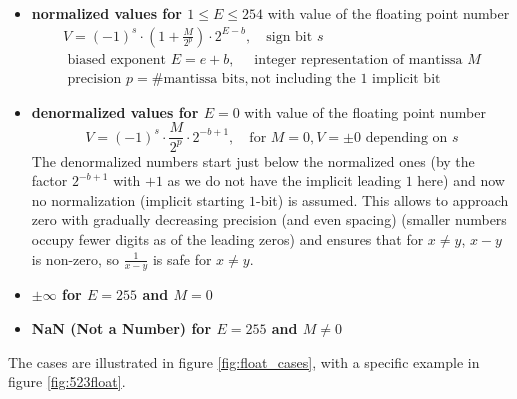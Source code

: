 \begin{itemize}
    \item \textbf{normalized values for $1 \leq E \leq 254$}  with value of the floating point number
    \begin{equation}
        \begin{multlined}
            V = (-1)^s \cdot \left(1 + \frac{M}{2^p}\right) \cdot 2^{E-b}, \quad \text{sign bit } s\\
            \text{ biased exponent } E = e + b, \quad \text{ integer representation of mantissa } M \\
            \text{ precision } p = \#\text{mantissa bits}, \text{not including the } 1 \text{ implicit bit}
        \end{multlined}
    \end{equation}
    \item \textbf{denormalized values for $E = 0$} with value of the floating point number
    \begin{equation}
        V = (-1)^s \cdot \frac{M}{2^p} \cdot 2^{-b + 1},  \quad \text{for } M = 0, V = \pm 0 \text{ depending on } s
    \end{equation}
    The denormalized numbers start just below the normalized ones (by the factor $2^{-b + 1}$ with $+1$ as we do not have the implicit leading $1$ here) and now no normalization (implicit starting $1$-bit) is assumed. This 
    allows to approach zero with gradually decreasing precision (and even spacing) (smaller numbers occupy fewer digits as of the leading zeros) and ensures that for $x\ne y$, $x-y$ is non-zero, so $\frac{1}{x-y}$ is safe for $x \ne y$.
    \item \textbf{$\pm \infty$ for $E = 255$ and $M = 0$}
    \item \textbf{NaN (Not a Number) for $E = 255$ and $M \ne 0$}
\end{itemize}


The cases are illustrated in figure \ref{fig:float_cases}, with a specific example in figure \ref{fig:523float}.

